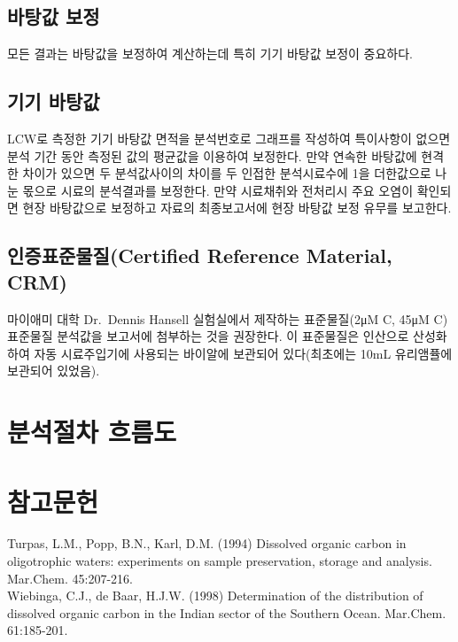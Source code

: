 \documentclass[
]{book}
\begin{document}
\hypertarget{uxbc14uxd0d5uxac12-uxbcf4uxc815}{%
\subsection{바탕값 보정}\label{uxbc14uxd0d5uxac12-uxbcf4uxc815}}

모든 결과는 바탕값을 보정하여 계산하는데 특히 기기 바탕값 보정이 중요하다.

\hypertarget{uxae30uxae30-uxbc14uxd0d5uxac12}{%
\subsection{기기 바탕값}\label{uxae30uxae30-uxbc14uxd0d5uxac12}}

LCW로 측정한 기기 바탕값 면적을 분석번호로 그래프를 작성하여 특이사항이 없으면 분석 기간 동안 측정된 값의 평균값을 이용하여 보정한다. 만약 연속한 바탕값에 현격한 차이가 있으면 두 분석값사이의 차이를 두 인접한 분석시료수에 1을 더한값으로 나눈 몫으로 시료의 분석결과를 보정한다. 만약 시료채취와 전처리시 주요 오염이 확인되면 현장 바탕값으로 보정하고 자료의 최종보고서에 현장 바탕값 보정 유무를 보고한다.

\hypertarget{uxc778uxc99duxd45cuxc900uxbb3cuxc9c8certified-reference-material-crm}{%
\subsection{인증표준물질(Certified Reference Material, CRM)}\label{uxc778uxc99duxd45cuxc900uxbb3cuxc9c8certified-reference-material-crm}}

마이애미 대학 Dr.~Dennis Hansell 실험실에서 제작하는 표준물질(2μM C, 45μM C) 표준물질 분석값을 보고서에 첨부하는 것을 권장한다. 이 표준물질은 인산으로 산성화하여 자동 시료주입기에 사용되는 바이알에 보관되어 있다(최초에는 10mL 유리앰퓰에 보관되어 있었음).

\hypertarget{uxbd84uxc11duxc808uxcc28-uxd750uxb984uxb3c4-3}{%
\section{분석절차 흐름도}\label{uxbd84uxc11duxc808uxcc28-uxd750uxb984uxb3c4-3}}

\hypertarget{uxcc38uxace0uxbb38uxd5cc-5}{%
\section{참고문헌}\label{uxcc38uxace0uxbb38uxd5cc-5}}

Turpas, L.M., Popp, B.N., Karl, D.M. (1994) Dissolved organic carbon in oligotrophic waters: experiments on sample preservation, storage and analysis. Mar.Chem. 45:207-216.\\
Wiebinga, C.J., de Baar, H.J.W. (1998) Determination of the distribution of dissolved organic carbon in the Indian sector of the Southern Ocean. Mar.Chem. 61:185-201.
\end{document}
